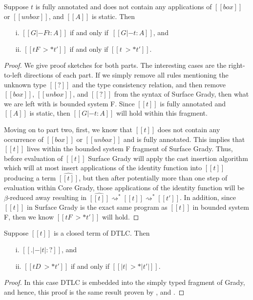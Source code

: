 \begin{lemma}
  \label{lemma:F-inclusion}
  Suppose $t$ is fully annotated and does not contain any applications
  of $[[box]]$ or $[[unbox]]$, and $[[A]]$ is static.  Then
  \begin{itemize}
  \item[i.] $[[G |-F t : A]]$ if and only if $\,[[G |- t : A]]$, and 
  \item[ii.] $[[t F~>* t']]$ if and only if $[[t ~>* t']]$.
  \end{itemize}
\end{lemma}
\begin{proof}
  We give proof sketches for both parts.  The interesting cases are
  the right-to-left directions of each part.  If we simply remove all
  rules mentioning the unknown type $[[?]]$ and the type consistency
  relation, and then remove $[[box]]$, $[[unbox]]$, and $[[?]]$ from
  the syntax of Surface Grady, then what we are left with is bounded
  system F.  Since $[[t]]$ is fully annotated and $[[A]]$ is static,
  then $[[G |- t : A]]$ will hold within this fragment.

  Moving on to part two, first, we know that $[[t]]$ does not contain
  any occurrence of $[[box]]$ or $[[unbox]]$ and is fully annotated.
  This implies that $[[t]]$ lives within the bounded system F fragment
  of Surface Grady. Thus, before evaluation of $[[t]]$ Surface Grady
  will apply the cast insertion algorithm which will at most insert
  applications of the identity function into $[[t]]$ producing a term
  $\widehat{[[t]]}$, but then after potentially more than one step of
  evaluation within Core Grady, those applications of the identity
  function will be $\beta$-reduced away resulting in $\widehat{[[t]]}
  \rightsquigarrow^* [[t]] \rightsquigarrow^* [[t']]$.  In addition,
  since $[[t]]$ in Surface Grady is the exact same program as $[[t]]$
  in bounded system F, then we know $[[t F~>* t']]$ will hold.
\end{proof}

\begin{lemma}
  \label{lemma:inclusion_of_dtlc}
  Suppose $[[t]]$ is a closed term of DTLC. Then
  \begin{itemize}
  \item[i.] $[[. |- |t| : ?]]$, and
  \item[ii.] $[[t D~>* t']]$ if and only if $[[|t| ~>* |t'|]]$.
  \end{itemize}
\end{lemma}
\begin{proof}
  In this case DTLC is embedded into the simply typed fragment of
  Grady, and hence, this proof is the same result proven by
  \cite{Siek:2006}, and \cite{Siek:2015}.
\end{proof}


